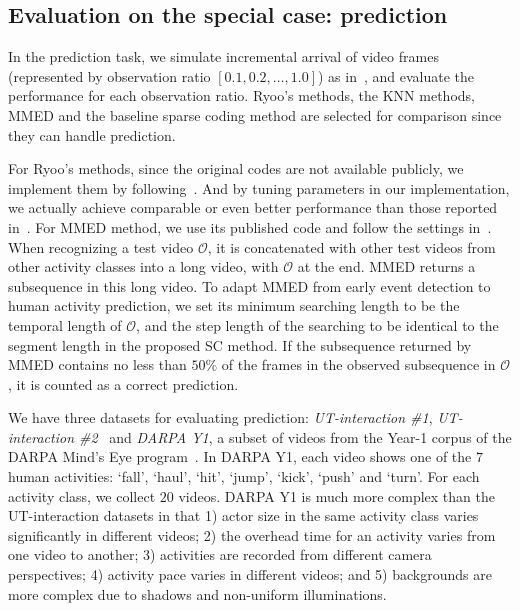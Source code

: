 \subsection{Evaluation on the special case: prediction}

In the prediction task, we simulate incremental arrival of video frames
(represented by observation ratio $[0.1, 0.2, \dots, 1.0]$) as
in~\cite{Ryoo2011}, and evaluate the performance for each observation
ratio. Ryoo's methods, the KNN methods, MMED and the baseline sparse coding
method are selected for comparison since they can handle prediction.

For Ryoo's methods, since the original codes are not available publicly, we
implement them by following~\cite{Ryoo2011}. And by tuning parameters in our
implementation, we actually achieve comparable or even better performance than
those reported in~\cite{Ryoo2011}.  For MMED method, we use its published code
and follow the settings in~\cite{MMED2012}.  When recognizing a test video
$\mathcal{O}$, it is concatenated with other test videos from other activity
classes into a long video, with $\mathcal{O}$ at the end. MMED returns a
subsequence in this long video.  To adapt MMED from early event detection to
human activity prediction, we set its minimum searching length to be the
temporal length of $\mathcal{O}$, and the step length of the searching to be
identical to the segment length in the proposed SC method.  If the subsequence
returned by MMED contains no less than $50\%$ of the frames in the observed
subsequence in $\mathcal{O}$, it is counted as a correct prediction.

We have three datasets for evaluating prediction: \textit{UT-interaction \#1},
\textit{UT-interaction \#2}~\cite{UT-Interaction-Data} and \textit{DARPA Y1}, a
subset of videos from the Year-1 corpus of the DARPA Mind's Eye
program~\cite{Darpa-dataset}.  In DARPA Y1, each video shows one of the $7$
human activities: `fall', `haul', `hit', `jump', `kick', `push' and `turn'.
For each activity class, we collect $20$ videos.
DARPA Y1 is much more complex than the UT-interaction datasets in that 1)
{\color{black}actor size} in the same activity class varies significantly in
different videos; 2) the overhead time for an activity varies from one video to
another; 3) activities are recorded from different camera perspectives; 4)
activity pace varies in different videos; and 5) backgrounds are more complex
due to shadows and non-uniform illuminations.


